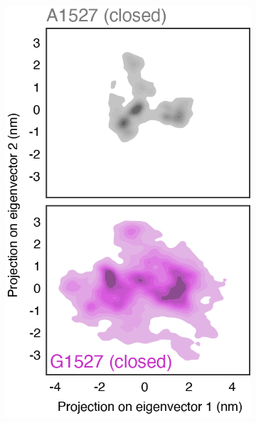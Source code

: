 \documentclass[12pt]{article}
\begin{document}
\begin{figure}[H]
\begin{subfigure}[t]{0.16\textwidth}
        \includegraphics[width=\textwidth]{../../paper/main_plots/variant_projection_closed.png}        
    \end{subfigure}
\end{figure}
\end{document}
